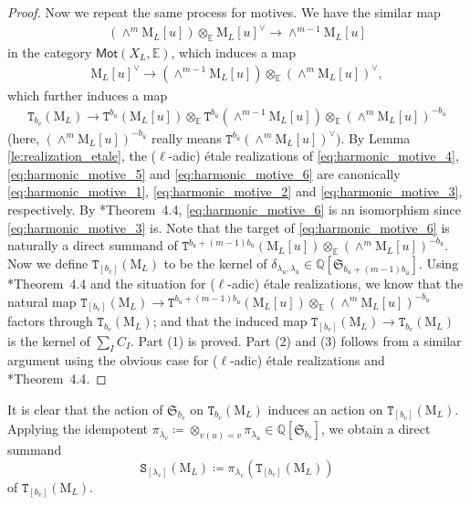 \documentclass[12pt]{amsart}
\numberwithin{equation}{section}
\theoremstyle{plain}
\theoremstyle{definition}
\theoremstyle{remark}
\renewcommand{\d}[1]{\mathbb{#1}}
\newcommand{\f}[1]{\mathfrak{#1}}
\renewcommand{\r}[1]{\mathrm{#1}}
\renewcommand{\sf}[1]{\mathsf{#1}}
\renewcommand{\(}{\left(}
\renewcommand{\)}{\right)}
\newcommand{\ol}[1]{\overline{#1}{}}
\newcommand{\dE}{\d E}
\newcommand{\dQ}{\d Q}
\newcommand{\fS}{\f S}
\newcommand{\rM}{\r M}
\newcommand{\tS}{\mathtt{S}}
\newcommand{\tT}{\mathtt{T}}
\newcommand{\Mot}{\sf{Mot}}
\begin{document}
\begin{proof}
Now we repeat the same process for motives. We have the similar map
\begin{align}\label{eq:harmonic_motive_4}
(\wedge^m \rM_L[u])\otimes_\dE \rM_L[u]^\vee\to\wedge^{m-1}\rM_L[u]
\end{align}
in the category $\Mot(X_L,\dE)$, which induces a map
\begin{align}\label{eq:harmonic_motive_5}
\rM_L[u]^\vee\to(\wedge^{m-1}\rM_L[u])\otimes_\dE(\wedge^m\rM_L[u])^{\vee},
\end{align}
which further induces a map
\begin{align}\label{eq:harmonic_motive_6}
\tT_{b_v}(\rM_L)\to\tT^{b_u}(\rM_L[u])\otimes_\dE\tT^{b_{\ol{u}}}(\wedge^{m-1}\rM_L[u])\otimes_\dE(\wedge^m\rM_L[u])^{-b_{\ol{u}}}
\end{align}
(here, $(\wedge^m\rM_L[u])^{-b_{\ol{u}}}$ really means $\tT^{b_{\ol{u}}}(\wedge^m\rM_L[u])^\vee$). By Lemma \ref{le:realization_etale}, the ($\ell$-adic) \'etale realizations of \eqref{eq:harmonic_motive_4}, \eqref{eq:harmonic_motive_5} and \eqref{eq:harmonic_motive_6} are canonically \eqref{eq:harmonic_motive_1}, \eqref{eq:harmonic_motive_2} and \eqref{eq:harmonic_motive_3}, respectively. By \cite{Wil18}*{Theorem~4.4}, \eqref{eq:harmonic_motive_6} is an isomorphism since \eqref{eq:harmonic_motive_3} is. Note that the target of \eqref{eq:harmonic_motive_6} is naturally a direct summand of $\tT^{b_u+(m-1)b_{\ol{u}}}(\rM_L[u])\otimes_\dE(\wedge^m\rM_L[u])^{-b_{\ol{u}}}$. Now we define $\tT_{[b_v]}(\rM_L)$ to be the kernel of $\delta_{\lambda_u,\lambda_{\ol{u}}}\in\dQ[\fS_{b_u+(m-1)b_{\ol{u}}}]$. Using \cite{Wil18}*{Theorem~4.4} and the situation for ($\ell$-adic) \'etale realizations, we know that the natural map $\tT_{[b_v]}(\rM_L)\to\tT^{b_u+(m-1)b_{\ol{u}}}(\rM_L[u])\otimes_\dE(\wedge^m\rM_L[u])^{-b_{\ol{u}}}$ factors through $\tT_{b_v}(\rM_L)$; and that the induced map $\tT_{[b_v]}(\rM_L)\to\tT_{b_v}(\rM_L)$ is the kernel of $\sum_{I}C_I$. Part (1) is proved. Part (2) and (3) follows from a similar argument using the obvious case for ($\ell$-adic) \'etale realizations and \cite{Wil18}*{Theorem~4.4}.
\end{proof}




It is clear that the action of $\fS_{b_v}$ on $\tT_{b_v}(\rM_L)$ induces an action on $\tT_{[b_v]}(\rM_L)$. Applying the idempotent $\pi_{\lambda_v}\coloneqq\otimes_{v(u)=v}\pi_{\lambda_u}\in\dQ[\fS_{b_v}]$, we obtain a direct summand
\[
\tS_{[\lambda_v]}(\rM_L)\coloneqq\pi_{\lambda_v}\(\tT_{[b_v]}(\rM_L)\)
\]
of $\tT_{[b_v]}(\rM_L)$.
\end{document}
